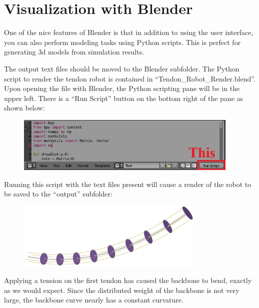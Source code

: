 \documentclass[12pt]{article}
\begin{document}
\section{Visualization with Blender}

One of the nice features of Blender is that in addition to using the user interface, you can also perform modeling tasks using Python scripts. This is perfect for generating 3d models from simulation results.

The output text files should be moved to the Blender subfolder. The Python script to render the tendon robot is contained in ``Tendon\_Robot\_Render.blend''. Upon opening the file with Blender, the Python scripting pane will be in the upper left. There is a ``Run Script'' button on the bottom right of the pane as shown below:
\begin{figure}[h]
	\centering
		\includegraphics[width=0.95\textwidth]{fig/ScriptingPane.jpg}
	\label{fig:Pane}
\end{figure}

\noindent
Running this script with the text files present will cause a render of the robot to be saved to the ``output'' subfolder:
\begin{figure}[h]
	\centering
		\includegraphics[width=0.8\textwidth]{fig/TendonRobotRender.jpg}
\end{figure}

\noindent Applying a tension on the first tendon has caused the backbone to bend, exactly as we would expect. Since the distributed weight of the backbone is not very large, the backbone curve nearly has a constant curvature.
\end{document}
